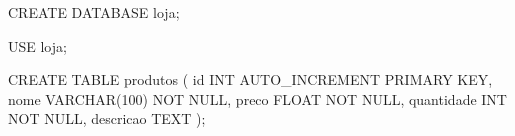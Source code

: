 CREATE DATABASE loja;

USE loja;

CREATE TABLE produtos (
    id INT AUTO_INCREMENT PRIMARY KEY,
    nome VARCHAR(100) NOT NULL,
    preco FLOAT NOT NULL,
    quantidade INT NOT NULL,
    descricao TEXT
);
